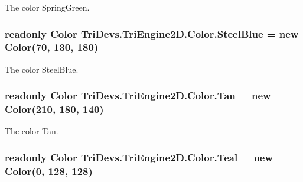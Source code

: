 The color Spring\-Green. 

\hypertarget{struct_tri_devs_1_1_tri_engine2_d_1_1_color_a6b775c157df3ce5c19890da5ed6921e4}{
\subsubsection[{Steel\-Blue}]{\setlength{\rightskip}{0pt plus 5cm}readonly {\bf Color} Tri\-Devs.\-Tri\-Engine2\-D.\-Color.\-Steel\-Blue = new {\bf Color}(70, 130, 180)\hspace{0.3cm}{\ttfamily [static]}}}\label{struct_tri_devs_1_1_tri_engine2_d_1_1_color_a6b775c157df3ce5c19890da5ed6921e4}


The color Steel\-Blue. 

\hypertarget{struct_tri_devs_1_1_tri_engine2_d_1_1_color_a8881c641f295417f78fbcd1b3f04038c}{
\subsubsection[{Tan}]{\setlength{\rightskip}{0pt plus 5cm}readonly {\bf Color} Tri\-Devs.\-Tri\-Engine2\-D.\-Color.\-Tan = new {\bf Color}(210, 180, 140)\hspace{0.3cm}{\ttfamily [static]}}}\label{struct_tri_devs_1_1_tri_engine2_d_1_1_color_a8881c641f295417f78fbcd1b3f04038c}


The color Tan. 

\hypertarget{struct_tri_devs_1_1_tri_engine2_d_1_1_color_a87bf44a15cb6a0295997984da16b58ca}{
\subsubsection[{Teal}]{\setlength{\rightskip}{0pt plus 5cm}readonly {\bf Color} Tri\-Devs.\-Tri\-Engine2\-D.\-Color.\-Teal = new {\bf Color}(0, 128, 128)\hspace{0.3cm}{\ttfamily [static]}}}\label{struct_tri_devs_1_1_tri_engine2_d_1_1_color_a87bf44a15cb6a0295997984da16b58ca}


